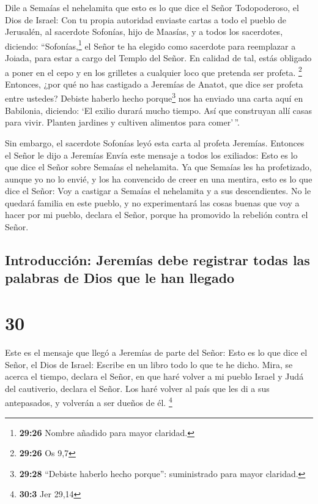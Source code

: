  Dile a Semaías el nehelamita  que esto es
lo que dice el Señor Todopoderoso, el Dios de Israel: Con tu propia
autoridad enviaste cartas a todo el pueblo de Jerusalén, al sacerdote
Sofonías, hijo de Maasías, y a todos los sacerdotes, diciendo:
 ``Sofonías,\footnote{\textbf{29:26} Nombre añadido para
  mayor claridad.} el Señor te ha elegido como sacerdote para reemplazar
a Joiada, para estar a cargo del Templo del Señor. En calidad de tal,
estás obligado a poner en el cepo y en los grilletes a cualquier loco
que pretenda ser profeta. \footnote{\textbf{29:26} Os 9,7}
 Entonces, ¿por qué no has castigado a Jeremías de
Anatot, que dice ser profeta entre ustedes?  Debiste
haberlo hecho porque\footnote{\textbf{29:28} ``Debiste haberlo hecho
  porque'': suministrado para mayor claridad.} nos ha enviado una carta
aquí en Babilonia, diciendo: `El exilio durará mucho tiempo. Así que
construyan allí casas para vivir. Planten jardines y cultiven alimentos
para comer'\,''.

 Sin embargo, el sacerdote Sofonías leyó esta carta al
profeta Jeremías.  Entonces el Señor le dijo a Jeremías
 Envía este mensaje a todos los exiliados: Esto es lo que
dice el Señor sobre Semaías el nehelamita. Ya que Semaías les ha
profetizado, aunque yo no lo envié, y los ha convencido de creer en una
mentira,  esto es lo que dice el Señor: Voy a castigar a
Semaías el nehelamita y a sus descendientes. No le quedará familia en
este pueblo, y no experimentará las cosas buenas que voy a hacer por mi
pueblo, declara el Señor, porque ha promovido la rebelión contra el
Señor.

\hypertarget{introducciuxf3n-jeremuxedas-debe-registrar-todas-las-palabras-de-dios-que-le-han-llegado}{%
\subsection{Introducción: Jeremías debe registrar todas las palabras de
Dios que le han
llegado}\label{introducciuxf3n-jeremuxedas-debe-registrar-todas-las-palabras-de-dios-que-le-han-llegado}}

\hypertarget{section-29}{%
\section{30}\label{section-29}}

 Este es el mensaje que llegó a Jeremías de parte del
Señor:  Esto es lo que dice el Señor, el Dios de Israel:
Escribe en un libro todo lo que te he dicho.  Mira, se
acerca el tiempo, declara el Señor, en que haré volver a mi pueblo
Israel y Judá del cautiverio, declara el Señor. Los haré volver al país
que les di a sus antepasados, y volverán a ser dueños de él. \footnote{\textbf{30:3}
  Jer 29,14}

